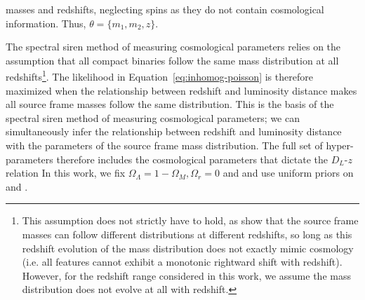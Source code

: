 \documentclass[]{aastex631}
\begin{document}
masses and redshifts, neglecting spins as they do not contain cosmological information.
Thus, $\theta = \{m_1,m_2,z\}$. 

The spectral siren method of measuring cosmological parameters relies on the assumption that all compact binaries follow the same mass distribution at all redshifts\footnote{This assumption does not strictly have to hold, as \citet{ezquiaga_spectral_2022} show that the source frame masses can follow different distributions at different redshifts, so long as this redshift evolution of the mass distribution does not exactly mimic cosmology (i.e. all features cannot exhibit a monotonic rightward shift with redshift). However, for the redshift range considered in this work, we assume the mass distribution does not evolve at all with redshift.}.
The likelihood in Equation~\ref{eq:inhomog-poisson} is therefore maximized when the relationship between redshift and luminosity distance makes all source frame masses follow the same distribution.
This is the basis of the spectral siren method of measuring cosmological parameters; we can simultaneously infer the relationship between redshift and luminosity distance with the parameters of the source frame mass distribution.
The full set of hyper-parameters therefore includes the cosmological parameters that dictate the $D_L$-$z$ relation 
In this work, we fix $\Omega_\Lambda=1-\Omega_M, \Omega_r=0$ and  and use uniform priors on \Ho{} and \Omm{}. 
\end{document}
